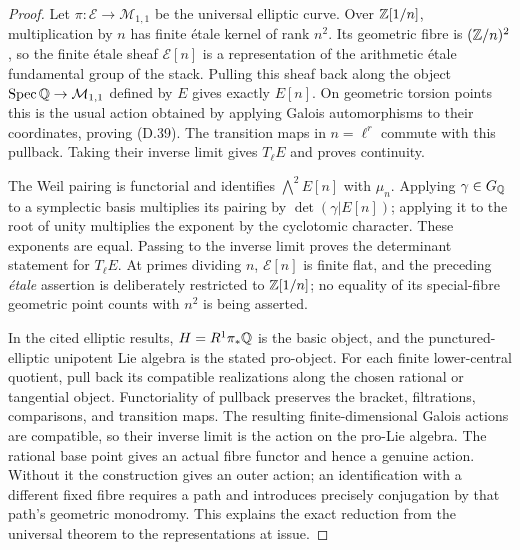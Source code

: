 \begin{proof}
Let \(\pi:\mathcal E\to\mathcal M_{1,1}\) be the universal
elliptic curve.  Over \(\mathbb Z[1/n]\), multiplication by \(n\)
has finite étale kernel of rank \(n^2\).
Its geometric fibre is \((\mathbb Z/n)^2\), so the finite étale
sheaf \(\mathcal E[n]\) is a representation of the
arithmetic étale fundamental group of the stack.
Pulling this sheaf back along the object
\(\operatorname{Spec}\mathbb Q\to\mathcal M_{1,1}\) defined by \(E\) gives
exactly \(E[n]\).  On geometric torsion points this is
the usual action obtained by applying Galois automorphisms
to their coordinates, proving (D.39).
The transition maps in \(n=\ell^r\) commute with this
pullback.  Taking their inverse limit gives \(T_\ell E\)
and proves continuity.

The Weil pairing is functorial and identifies
\(\bigwedge^2 E[n]\) with \(\mu_n\).
Applying \(\gamma\in G_\mathbb Q\) to a symplectic basis multiplies
its pairing by \(\det(\gamma|E[n])\); applying it to the
root of unity multiplies the exponent by the cyclotomic
character.  These exponents are equal.  Passing to the
inverse limit proves the determinant statement for
\(T_\ell E\).
At primes dividing \(n\), \(\mathcal E[n]\) is finite flat,
and the preceding \emph{étale} assertion is deliberately
restricted to \(\mathbb Z[1/n]\); no equality of its special-fibre
geometric point counts with \(n^2\) is being asserted.

In the cited elliptic results, \(H=R^1\pi_*\mathbb Q\) is the
basic object, and the punctured-elliptic unipotent Lie
algebra is the stated pro-object.
For each finite lower-central quotient, pull back its
compatible realizations along the chosen rational or
tangential object.  Functoriality of pullback preserves
the bracket, filtrations, comparisons, and transition
maps.  The resulting finite-dimensional Galois actions
are compatible, so their inverse limit is the action
on the pro-Lie algebra.  The rational base point gives
an actual fibre functor and hence a genuine action.
Without it the construction gives an outer action;
an identification with a different fixed fibre requires
a path and introduces precisely conjugation by that
path's geometric monodromy.
This explains the exact reduction from the universal
theorem to the representations at issue.


\end{proof}
